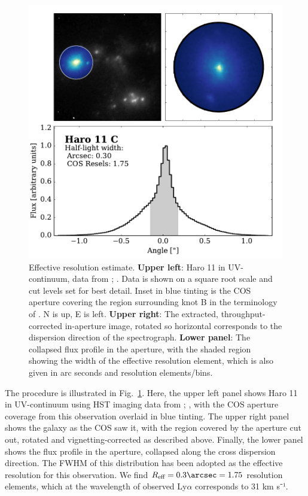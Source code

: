 \documentclass[twocolumn]{aastex61}
\begin{document}
\begin{figure}
\centering
\includegraphics[width=1.000\hsize]{./EffResol.pdf}
\caption{Effective resolution estimate. \textbf{Upper left}: Haro 11 in
UV-continuum, data from \citet{Ostlin2009}; \citet{Hayes2009}. Data is
shown on a square root scale and cut levels set for best detail. Inset
in blue tinting is the COS aperture covering the region surrounding knot
B in the terminology of \citet{Vader1993}. N is up, E is left.
\textbf{Upper right}: The extracted, throughput-corrected in-aperture
image, rotated so horizontal corresponds to the dispersion direction of
the spectrograph. \textbf{Lower panel}: The collapsed flux profile in
the aperture, with the shaded region showing the width of the effective
resolution element, which is also given in arc seconds and resolution
elements/bins.}\label{fig:resol}
\end{figure}

The procedure is illustrated in Fig.~\ref{fig:resol}. Here, the upper
left panel shows Haro 11 in UV-continuum using HST imaging data from
\citet{Ostlin2009}; \citet{Hayes2009}, with the COS aperture coverage
from this observation overlaid in blue tinting. The upper right panel
shows the galaxy as the COS saw it, with the region covered by the
aperture cut out, rotated and vignetting-corrected as described above.
Finally, the lower panel shows the flux profile in the aperture,
collapsed along the cross dispersion direction. The FWHM of this
distribution has been adopted as the effective resolution for this
observation. We find $R_{\text{eff}} = 0.3 \arcsec = 1.75$ resolution
elements, which at the wavelength of observed Ly$\alpha$ corresponds to
31 km s⁻¹.
\end{document}
